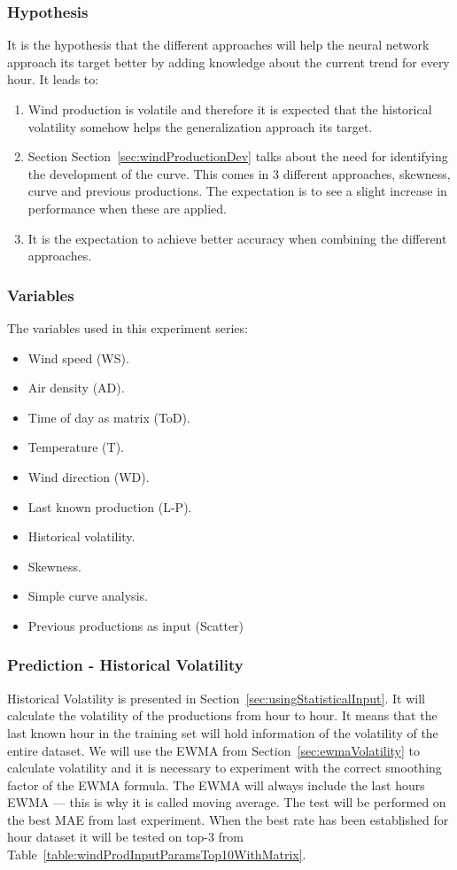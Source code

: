 \subsubsection{Hypothesis} 
It is the hypothesis that the different approaches will help the neural network approach its target better by adding knowledge about the current trend for every hour. It leads to: 

\begin{enumerate}
\item Wind production is volatile and therefore it is expected that the historical volatility somehow helps the generalization approach its target.
\item Section Section~\ref{sec:windProductionDev} talks about the need for identifying the development of the curve. This comes in 3 different approaches, skewness, curve and previous productions. The expectation is to see a slight increase in performance when these are applied.
\item It is the expectation to achieve better accuracy when combining the different approaches.
\end{enumerate}

\subsubsection{Variables}
The variables used in this experiment series:

\begin{itemize}
\item Wind speed (WS).
\item Air density (AD).
\item Time of day as matrix (ToD).
\item Temperature (T).
\item Wind direction (WD).
\item Last known production (L-P).
\item Historical volatility.
\item Skewness.
\item Simple curve analysis.
\item Previous productions as input (Scatter)
\end{itemize}

\subsubsection{Prediction - Historical Volatility}
Historical Volatility is presented in Section~\ref{sec:usingStatisticalInput}. It will calculate the volatility of the productions from hour to hour. It means that the last known hour in the training set will hold information of the volatility of the entire dataset. We will use the EWMA from Section~\ref{sec:ewmaVolatility} to calculate volatility and it is necessary to experiment with the correct smoothing factor of the EWMA formula. The EWMA will always include the last hours EWMA --- this is why it is called moving average. The test will be performed on the best MAE from last experiment. When the best rate has been established for hour dataset it will be tested on top-3 from Table~\ref{table:windProdInputParamsTop10WithMatrix}.

